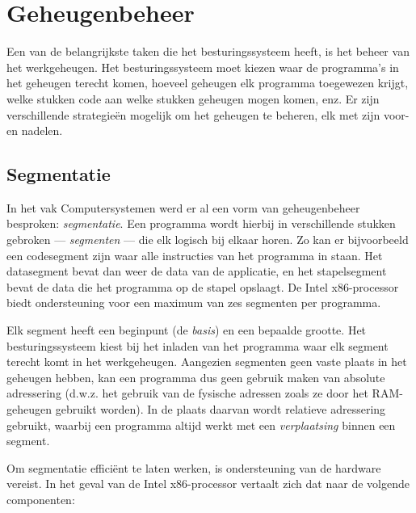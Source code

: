 \chapter{Geheugenbeheer}

Een van de belangrijkste taken die het besturingssysteem heeft, is het beheer
van het werkgeheugen. Het besturingssysteem moet kiezen waar de programma's in
het geheugen terecht komen, hoeveel geheugen elk programma toegewezen krijgt,
welke stukken code aan welke stukken geheugen mogen komen, enz. Er zijn
verschillende strategie\"en mogelijk om het geheugen te beheren, elk met zijn
voor- en nadelen.

\section{Segmentatie}

In het vak Computersystemen werd er al een vorm van geheugenbeheer besproken:
\emph{segmentatie}. Een programma wordt hierbij in verschillende stukken
gebroken --- \emph{segmenten} --- die elk logisch bij elkaar horen. Zo kan er bijvoorbeeld een
codesegment zijn waar alle instructies van het programma in staan. Het
datasegment bevat dan weer de data van de applicatie, en het stapelsegment bevat
de data die het programma op de stapel opslaagt. De Intel x86-processor biedt
ondersteuning voor een maximum van zes segmenten per programma.

Elk segment heeft een beginpunt (de \emph{basis}) en een bepaalde grootte. Het
besturingssysteem kiest bij het inladen van het programma waar elk segment
terecht komt in het werkgeheugen. Aangezien segmenten geen vaste plaats in het geheugen hebben, kan
een programma dus geen gebruik maken van absolute adressering (d.w.z. het
gebruik van de fysische adressen zoals ze door het RAM-geheugen gebruikt
worden). In de plaats daarvan wordt relatieve adressering gebruikt, waarbij een
programma altijd werkt met een \emph{verplaatsing} binnen een segment.

Om segmentatie effici\"ent te laten werken, is ondersteuning van de hardware
vereist. In het geval van de Intel x86-processor vertaalt zich dat naar de
volgende componenten:

